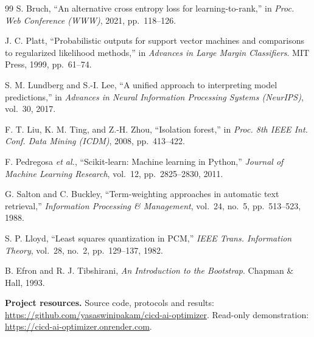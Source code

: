 \begin{thebibliography}{99}
 S. Bruch, ``An alternative cross entropy loss for learning-to-rank,'' in \emph{Proc. Web Conference (WWW)}, 2021, pp.~118--126.

 J. C. Platt, ``Probabilistic outputs for support vector machines and comparisons to regularized likelihood methods,'' in \emph{Advances in Large Margin Classifiers}. MIT Press, 1999, pp.~61--74.

 S. M. Lundberg and S.-I. Lee, ``A unified approach to interpreting model predictions,'' in \emph{Advances in Neural Information Processing Systems (NeurIPS)}, vol.~30, 2017.

 F. T. Liu, K. M. Ting, and Z.-H. Zhou, ``Isolation forest,'' in \emph{Proc. 8th IEEE Int. Conf. Data Mining (ICDM)}, 2008, pp.~413--422.

 F. Pedregosa \emph{et al.}, ``Scikit-learn: Machine learning in Python,'' \emph{Journal of Machine Learning Research}, vol.~12, pp.~2825--2830, 2011.

 G. Salton and C. Buckley, ``Term-weighting approaches in automatic text retrieval,'' \emph{Information Processing \& Management}, vol.~24, no.~5, pp.~513--523, 1988.

 S. P. Lloyd, ``Least squares quantization in PCM,'' \emph{IEEE Trans. Information Theory}, vol.~28, no.~2, pp.~129--137, 1982.

 B. Efron and R. J. Tibshirani, \emph{An Introduction to the Bootstrap}. Chapman \& Hall, 1993.

\end{thebibliography}
\endgroup

\vspace{6pt}
\noindent\textbf{Project resources.} Source code, protocols and results: \url{https://github.com/yasaswinipakam/cicd-ai-optimizer}. Read-only demonstration: \url{https://cicd-ai-optimizer.onrender.com}.
